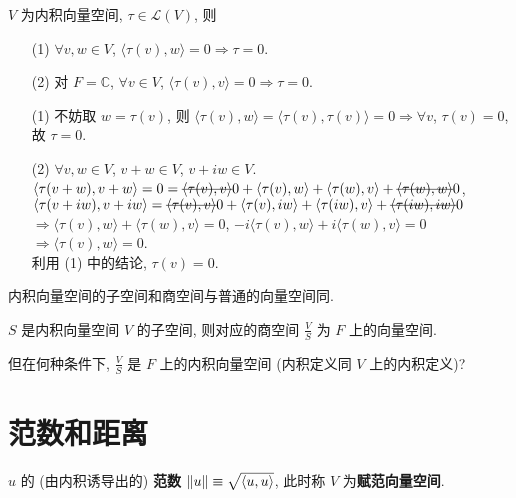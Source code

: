 \documentclass{note}
\begin{document}
\begin{thm}\label{thm-9.2}
    $V$ 为内积向量空间, $\tau\in\mathcal{L}(V)$, 则
    \begin{itemize}
        \item[(1)] $\forall v,w\in V$, $\langle\tau(v),w\rangle=0\Longrightarrow\tau=0$.
        \item[(2)] 对 $F=\mathbb{C}$, $\forall v\in V$, $\langle\tau(v),v\rangle=0\Longrightarrow\tau=0$.
    \end{itemize}
\end{thm}
\begin{pf}
    \begin{itemize}
        \item[(1)] 不妨取 $w=\tau(v)$, 则 $\langle\tau(v),w\rangle=\langle\tau(v),\tau(v)\rangle=0\Longrightarrow\forall v$, $\tau(v)=0$, 故 $\tau=0$.
        \item[(2)] $\forall v,w\in V$, $v+w\in V$, $v+iw\in V$.\\
        $\langle\tau(v+w),v+w\rangle=0=\msout{\langle\tau(v),v\rangle}0+\langle\tau(v),w\rangle+\langle\tau(w),v\rangle+\msout{\langle\tau(w),w\rangle}0$, $\langle\tau(v+iw),v+iw\rangle=\msout{\langle\tau(v),v\rangle}0+\langle\tau(v),iw\rangle+\langle\tau(iw),v\rangle+\msout{\langle\tau(iw),iw\rangle}0$\\
        $\Longrightarrow\langle\tau(v),w\rangle+\langle\tau(w),v\rangle=0$, $-i\langle\tau(v),w\rangle+i\langle\tau(w),v\rangle=0$\\
        $\Longrightarrow\langle\tau(v),w\rangle=0$.\\
        利用 (1) 中的结论, $\tau(v)=0$.
    \end{itemize}
\end{pf}

内积向量空间的子空间和商空间与普通的向量空间同.

$S$ 是内积向量空间 $V$ 的子空间, 则对应的商空间 $\frac{V}{S}$ 为 $F$ 上的向量空间.

但在何种条件下, $\frac{V}{S}$ 是 $F$ 上的内积向量空间 (内积定义同 $V$ 上的内积定义)?

\section{范数和距离}
\begin{df}
    $u$ 的 (由内积诱导出的) \textbf{范数} $\left\lVert u\right\rVert\equiv\sqrt{\langle u,u\rangle}$, 此时称 $V$ 为\textbf{赋范向量空间}.
\end{df}
\end{document}
